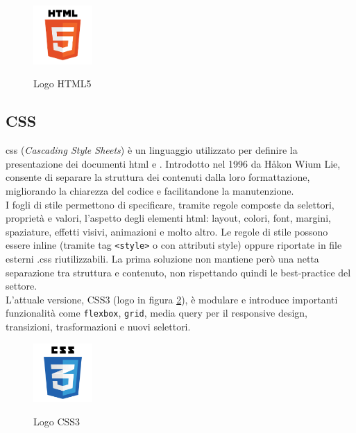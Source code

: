 \begin{figure}[H]
    \centering
    \includegraphics[width=0.2\textwidth, alt={Logo HTML5}]{img/html5.png}
    \caption[Logo HTML5]{Logo HTML5}\label{fig:logo_HTML5}
\end{figure}

\subsection{CSS}
\label{subsec:css}
\noindent \acrshort{css} (\textit{Cascading Style Sheets}) è un linguaggio utilizzato per definire la presentazione dei documenti \acrshort{html} e . Introdotto nel 1996 da Håkon Wium Lie, consente di separare la struttura dei contenuti dalla loro formattazione, migliorando la chiarezza del codice e facilitandone la manutenzione.\\ 
I fogli di stile permettono di specificare, tramite regole composte da selettori, proprietà e valori, l’aspetto degli elementi \acrshort{html}: layout, colori, font, margini, spaziature, effetti visivi, animazioni e molto altro. Le regole di stile possono essere inline (tramite tag \texttt{<style>} o con attributi style) oppure riportate in file esterni .css riutilizzabili. La prima soluzione non mantiene però una netta separazione tra struttura e contenuto, non rispettando quindi le best-practice del settore.\\ 
L'attuale versione, CSS3 (logo in figura \ref{fig:logo_CSS3}), è modulare e introduce importanti funzionalità come \texttt{flexbox}, \texttt{grid}, media query per il responsive design, transizioni, trasformazioni e nuovi selettori.
\begin{figure}[H]
    \centering
    \includegraphics[width=0.2\textwidth, alt={Logo CSS3}]{img/css3.png}
    \caption[Logo CSS3]{Logo CSS3}\label{fig:logo_CSS3}
\end{figure}


